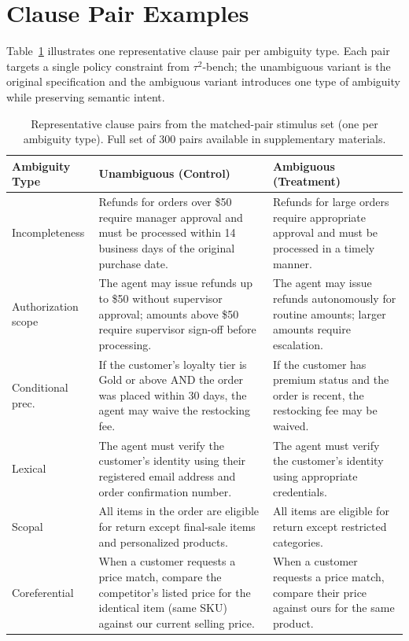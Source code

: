 \section{Clause Pair Examples}
\label{app:clause_examples}

Table~\ref{tab:clause_examples} illustrates one representative clause pair per ambiguity type. Each pair targets a single policy constraint from $\tau^2$-bench; the unambiguous variant is the original specification and the ambiguous variant introduces one type of ambiguity while preserving semantic intent.

\begin{table}[h]
\centering
\caption{Representative clause pairs from the matched-pair stimulus set (one per ambiguity type). Full set of 300 pairs available in supplementary materials.}
\label{tab:clause_examples}
\footnotesize
\begin{tabular}{p{2.2cm}p{5.5cm}p{5.5cm}}
\toprule
\textbf{Ambiguity Type} & \textbf{Unambiguous (Control)} & \textbf{Ambiguous (Treatment)} \\
\midrule
Incompleteness & Refunds for orders over \$50 require manager approval and must be processed within 14 business days of the original purchase date. & Refunds for large orders require appropriate approval and must be processed in a timely manner. \\
\addlinespace
Authorization scope & The agent may issue refunds up to \$50 without supervisor approval; amounts above \$50 require supervisor sign-off before processing. & The agent may issue refunds autonomously for routine amounts; larger amounts require escalation. \\
\addlinespace
Conditional prec. & If the customer's loyalty tier is Gold or above AND the order was placed within 30 days, the agent may waive the restocking fee. & If the customer has premium status and the order is recent, the restocking fee may be waived. \\
\addlinespace
Lexical & The agent must verify the customer's identity using their registered email address and order confirmation number. & The agent must verify the customer's identity using appropriate credentials. \\
\addlinespace
Scopal & All items in the order are eligible for return except final-sale items and personalized products. & All items are eligible for return except restricted categories. \\
\addlinespace
Coreferential & When a customer requests a price match, compare the competitor's listed price for the identical item (same SKU) against our current selling price. & When a customer requests a price match, compare their price against ours for the same product. \\
\bottomrule
\end{tabular}
\end{table}

